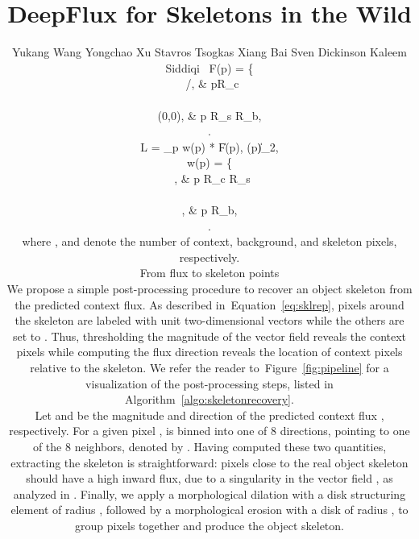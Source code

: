 \documentclass[10pt,twocolumn,letterpaper]{article}
\newcommand{\reffig}[1]{Figure~\ref{#1}}
\newcommand{\refeq}[1]{Equation~\eqref{#1}}
\begin{document}
\title{DeepFlux for Skeletons in the Wild}

\author{
Yukang Wang \quad Yongchao Xu \quad Stavros Tsogkas \quad Xiang Bai \quad Sven Dickinson \quad Kaleem Siddiqi
\
F(p) =
\left\{
\begin{matrix} \
/\left\vert{}\right\vert, & p\in R_c  \\ \\
(0,0), & p \in R_s \cup R_b,
\end{matrix}
\right.
\label{eq:sklrep}

L \; = \; \sum_{p \in \Omega}{w(p) * \left\|F(p), \hat{F}(p)\right\|_2},
\label{eq:loss}

w(p) =
\left\{
\begin{matrix} \
\frac{|R_b|}{|R_c|+|R_b|+|R_s|}, & p \in R_c \cup R_s \\ \\
\frac{|R_c|+|R_s|}{|R_c|+|R_b|+|R_s|}, & p \in R_b,
\end{matrix}
\right.
\label{eq:weight}

where ,  and  denote the number of context, background, and skeleton pixels, respectively.

\subsection{From flux to skeleton points} \label{sec:postprocessing}
We propose a simple post-processing procedure to recover an object skeleton from the predicted context flux.
As described in~\refeq{eq:sklrep}, pixels around the skeleton are labeled with unit two-dimensional vectors while the others are set to .
Thus, thresholding the magnitude of the vector field reveals the context pixels while
computing the flux direction reveals the location of context pixels relative to the skeleton. We refer the reader to~\reffig{fig:pipeline} for a visualization of the post-processing steps, listed in Algorithm~\ref{algo:skeletonrecovery}.

Let  and  be the magnitude and direction of the predicted context flux , respectively.
For a given pixel ,  is binned into one of 8 directions, pointing to one of the 8 neighbors, denoted by .
Having computed these two quantities, extracting the skeleton is straightforward:
pixels close to the real object skeleton should have a high inward flux, due to a singularity in the vector field , as analyzed in \cite{dimitrov2003}.
Finally, we apply a morphological dilation with a disk structuring element of radius , followed by a morphological erosion with a disk of radius , to group pixels together and produce the object skeleton.

}
\end{document}
